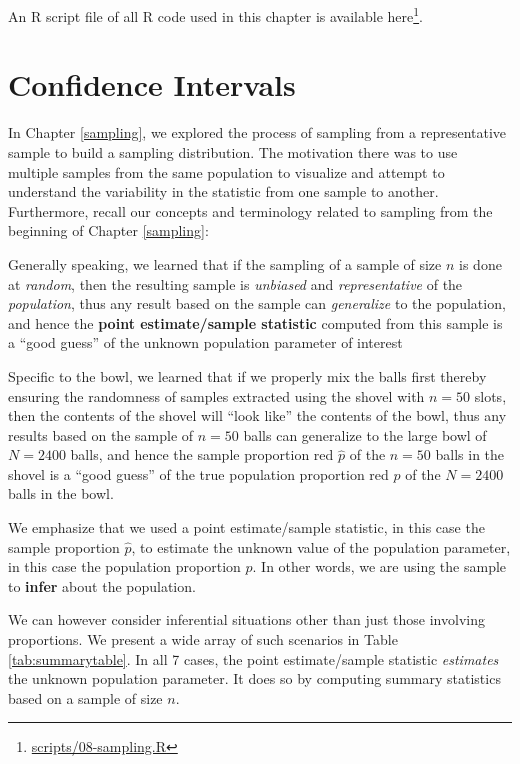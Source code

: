 \documentclass[12pt,]{krantz}
\renewcommand{\href}[2]{#2\footnote{\url{#1}}}
\theoremstyle{definition}
\theoremstyle{definition}
\theoremstyle{definition}
\theoremstyle{remark}
\begin{document}
An R script file of all R code used in this chapter is available
\href{scripts/08-sampling.R}{here}.

\chapter{Confidence Intervals}\label{confidence-intervals}

In Chapter \ref{sampling}, we explored the process of sampling from a
representative sample to build a sampling distribution. The motivation
there was to use multiple samples from the same population to visualize
and attempt to understand the variability in the statistic from one
sample to another. Furthermore, recall our concepts and terminology
related to sampling from the beginning of Chapter \ref{sampling}:

Generally speaking, we learned that if the sampling of a sample of size
\(n\) is done at \emph{random}, then the resulting sample is
\emph{unbiased} and \emph{representative} of the \emph{population}, thus
any result based on the sample can \emph{generalize} to the population,
and hence the \textbf{point estimate/sample statistic} computed from
this sample is a ``good guess'' of the unknown population parameter of
interest

Specific to the bowl, we learned that if we properly mix the balls first
thereby ensuring the randomness of samples extracted using the shovel
with \(n=50\) slots, then the contents of the shovel will ``look like''
the contents of the bowl, thus any results based on the sample of
\(n=50\) balls can generalize to the large bowl of \(N=2400\) balls, and
hence the sample proportion red \(\widehat{p}\) of the \(n=50\) balls in
the shovel is a ``good guess'' of the true population proportion red
\(p\) of the \(N=2400\) balls in the bowl.

We emphasize that we used a point estimate/sample statistic, in this
case the sample proportion \(\widehat{p}\), to estimate the unknown
value of the population parameter, in this case the population
proportion \(p\). In other words, we are using the sample to
\textbf{infer} about the population.

We can however consider inferential situations other than just those
involving proportions. We present a wide array of such scenarios in
Table \ref{tab:summarytable}. In all 7 cases, the point estimate/sample
statistic \emph{estimates} the unknown population parameter. It does so
by computing summary statistics based on a sample of size \(n\).
\end{document}
